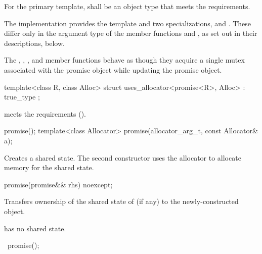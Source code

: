 \pnum
For the primary template,  shall be an object type that
meets the  requirements.

\pnum
The implementation provides the template  and two specializations,
 and . These differ only in the argument type
of the member functions  and ,
as set out in their descriptions, below.

\pnum
The , , ,
and  member functions behave as though
they acquire a single mutex associated with the promise object while updating the
promise object.

%
\begin{itemdecl}
template<class R, class Alloc>
  struct uses_allocator<promise<R>, Alloc>
    : true_type { };
\end{itemdecl}

\begin{itemdescr}
\pnum
\expects
{} meets the 
requirements ().
\end{itemdescr}

%
\begin{itemdecl}
promise();
template<class Allocator>
  promise(allocator_arg_t, const Allocator& a);
\end{itemdecl}

\begin{itemdescr}
\pnum
\effects
Creates a shared state. The second
constructor uses the allocator  to allocate memory for the shared
state.
\end{itemdescr}

%
\begin{itemdecl}
promise(promise&& rhs) noexcept;
\end{itemdecl}

\begin{itemdescr}
\pnum
\effects
Transfers ownership of the shared state
of  (if any) to the newly-constructed object.

\pnum
\ensures
{} has no shared state.
\end{itemdescr}

%
\begin{itemdecl}
~promise();
\end{itemdecl}

